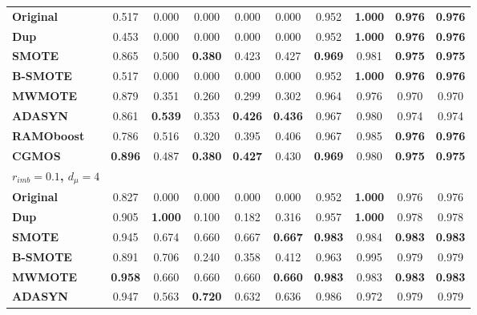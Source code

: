\documentclass{iitthesis}
\begin{document}
\begin{table}[]
\begin{center}
{\begin{tabular}{lccccccccc}
\hline
\multicolumn{1}{l}{\textbf{Original}} & 0.517 & 0.000 & 0.000 & 0.000 & 0.000 & 0.952 & \textbf{1.000} & \textbf{0.976} & \textbf{0.976} \\ 
\multicolumn{1}{l}{\textbf{Dup}} & 0.453 & 0.000 & 0.000 & 0.000 & 0.000 & 0.952 & \textbf{1.000} & \textbf{0.976} & \textbf{0.976} \\ 
\multicolumn{1}{l}{\textbf{SMOTE}} & 0.865 & 0.500 & \textbf{0.380} & 0.423 & 0.427 & \textbf{0.969} & 0.981 & \textbf{0.975} & \textbf{0.975} \\
\multicolumn{1}{l}{\textbf{B-SMOTE}} & 0.517 & 0.000 & 0.000 & 0.000 & 0.000 & 0.952 & \textbf{1.000} & \textbf{0.976} & \textbf{0.976} \\
\multicolumn{1}{l}{\textbf{MWMOTE}} & 0.879 & 0.351 & 0.260 & 0.299 & 0.302 & 0.964 & 0.976 & 0.970 & 0.970 \\
\multicolumn{1}{l}{\textbf{ADASYN}} & 0.861 & \textbf{0.539} & 0.353 & \textbf{0.426} & \textbf{0.436} & 0.967 & 0.980 & 0.974 & 0.974 \\
\multicolumn{1}{l}{\textbf{RAMOboost}} & 0.786 & 0.516 & 0.320 & 0.395 & 0.406 & 0.967 & 0.985 & \textbf{0.976} & \textbf{0.976} \\
\multicolumn{1}{l}{\textbf{CGMOS}} & \textbf{0.896} & 0.487 & \textbf{0.380} & \textbf{0.427} & 0.430 & \textbf{0.969} & 0.980 & \textbf{0.975} & \textbf{0.975} \\
\hline
\multicolumn{1}{l}{\textbf{$r_{imb}=0.1$, $d_{\mu}=4$}} &  & \multicolumn{4}{c}{} & \multicolumn{4}{c}{} \\
\hline
\multicolumn{1}{l}{\textbf{Original}} & 0.827 & 0.000 & 0.000 & 0.000 & 0.000 & 0.952 & \textbf{1.000} & 0.976 & 0.976 \\
\multicolumn{1}{l}{\textbf{Dup}} & 0.905 & \textbf{1.000} & 0.100 & 0.182 & 0.316 & 0.957 & \textbf{1.000} & 0.978 & 0.978 \\
\multicolumn{1}{l}{\textbf{SMOTE}} & 0.945 & 0.674 & 0.660 & 0.667 & \textbf{0.667} & \textbf{0.983} & 0.984 & \textbf{0.983} & \textbf{0.983} \\ 
\multicolumn{1}{l}{\textbf{B-SMOTE}} & 0.891 & 0.706 & 0.240 & 0.358 & 0.412 & 0.963 & 0.995 & 0.979 & 0.979 \\
\multicolumn{1}{l}{\textbf{MWMOTE}} & \textbf{0.958} & 0.660 & 0.660 & 0.660 & \textbf{0.660} & \textbf{0.983} & 0.983 & \textbf{0.983} & \textbf{0.983} \\
\multicolumn{1}{l}{\textbf{ADASYN}} & 0.947 & 0.563 & \textbf{0.720} & 0.632 & 0.636 & 0.986 & 0.972 & 0.979 & 0.979 \\

\end{tabular}}
\end{center}
\end{table}
\end{document}
